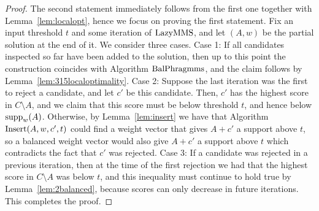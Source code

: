 \begin{proof}
The second statement immediately follows from the first one together with Lemma~\ref{lem:localopt}, hence we focus on proving the first statement. 
Fix an input threshold $t$ and some iteration of $\operatorname{LazyMMS}$, and let $(A,w)$ be the partial solution at the end of it. 
We consider three cases. Case 1: If all candidates inspected so far have been added to the solution, then up to this point the construction coincides with Algorithm $\operatorname{BalPhragmms}$, and the claim follows by Lemma~\ref{lem:315localoptimality}. 
Case 2: Suppose the last iteration was the first to reject a candidate, and let $c'$ be this candidate. Then, $c'$ has the highest score in $C\setminus A$, and we claim that this score must be below threshold $t$, and hence below $\operatorname{supp}_w(A)$. Otherwise, by Lemma~\ref{lem:insert} we have that Algorithm $\operatorname{Insert}(A,w,c',t)$ could find a weight vector that gives $A+c'$ a support above $t$, so a balanced weight vector would also give $A+c'$ a support above $t$ which contradicts the fact that $c'$ was rejected. 
Case 3: If a candidate was rejected in a previous iteration, then at the time of the first rejection we had that the highest score in $C\setminus A$ was below $t$, and this inequality must continue to hold true by Lemma~\ref{lem:2balanced}, because scores can only decrease in future iterations. This completes the proof.
\end{proof}